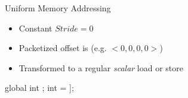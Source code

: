\begin{frame}[fragile]{Uniform Memory Addressing}

\begin{itemize}
    \item Constant $Stride = 0$
    \item Packetized offset is  (e.g. $<0, 0, 0, 0>$)
    \item Transformed to a regular \emph{scalar} load or store
\end{itemize}

\begin{codebox}[commandchars=\\\[\]]
global int \uniform[*src];
int \uniform[x] = \uniform[src]\idx[\uniform[0]];
\end{codebox}


\end{frame}



